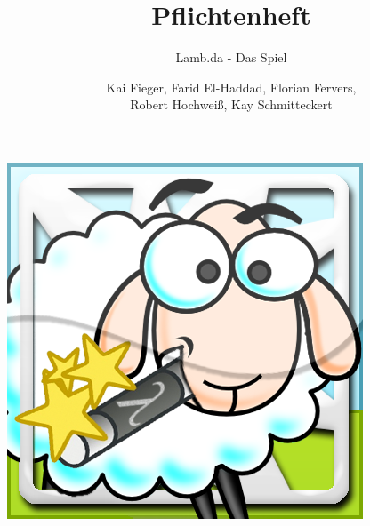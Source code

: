 \documentclass[parskip=full]{scrartcl}
\title{Pflichtenheft }
\subtitle{Lamb.da - Das Spiel}
\author{ 	
Kai Fieger, Farid El-Haddad,  Florian Fervers,
\\
Robert Hochweiß,  Kay Schmitteckert
}
\begin{document}
\maketitle
	\begin{center}
	\includegraphics[width=300pt]{../GUI-Entwurf/icon.png}
	\end{center}
	
\newpage
\tableofcontents
\newpage

\newpage










\newpage

\end{document}

